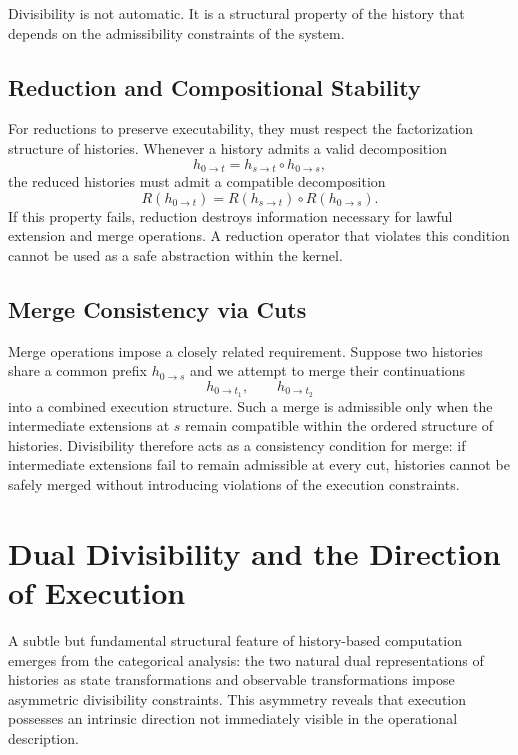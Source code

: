 \documentclass[12pt]{article}
\begin{document}
Divisibility is not automatic. It is a structural property of the history that depends on the
admissibility constraints of the system.

\subsection{Reduction and Compositional Stability}

For reductions to preserve executability, they must respect the factorization structure of
histories. Whenever a history admits a valid decomposition
\[
h_{0 \to t} = h_{s \to t} \circ h_{0 \to s},
\]
the reduced histories must admit a compatible decomposition
\[
R(h_{0 \to t}) = R(h_{s \to t}) \circ R(h_{0 \to s}).
\]
If this property fails, reduction destroys information necessary for lawful extension and merge
operations. A reduction operator that violates this condition cannot be used as a safe
abstraction within the kernel.

\subsection{Merge Consistency via Cuts}

Merge operations impose a closely related requirement. Suppose two histories share a common
prefix $h_{0 \to s}$ and we attempt to merge their continuations
\[
h_{0 \to t_1}, \qquad h_{0 \to t_2}
\]
into a combined execution structure. Such a merge is admissible only when the intermediate
extensions at $s$ remain compatible within the ordered structure of histories. Divisibility
therefore acts as a consistency condition for merge: if intermediate extensions fail to remain
admissible at every cut, histories cannot be safely merged without introducing violations of
the execution constraints.

\section{Dual Divisibility and the Direction of Execution}
\label{sec:divisibility}

A subtle but fundamental structural feature of history-based computation emerges from the
categorical analysis: the two natural dual representations of histories as state transformations
and observable transformations impose asymmetric divisibility constraints. This asymmetry
reveals that execution possesses an intrinsic direction not immediately visible in the
operational description.
\end{document}
